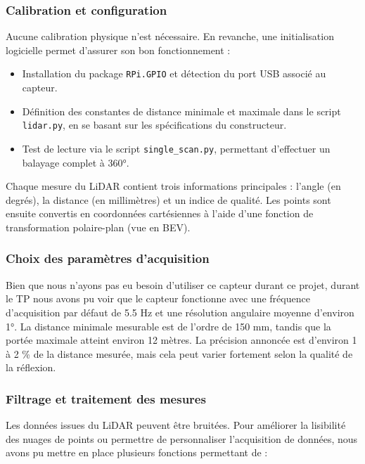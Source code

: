 \vspace{1em}
\subsubsection*{Calibration et configuration}

Aucune calibration physique n'est nécessaire. En revanche, une initialisation logicielle permet d'assurer son bon fonctionnement :

\begin{itemize}
    \item Installation du package \texttt{RPi.GPIO} et détection du port USB associé au capteur.
    \item Définition des constantes de distance minimale et maximale dans le script \texttt{lidar.py}, en se basant sur les spécifications du constructeur.
    \item Test de lecture via le script \texttt{single\_scan.py}, permettant d’effectuer un balayage complet à 360°.
\end{itemize}

Chaque mesure du LiDAR contient trois informations principales : l’angle (en degrés), la distance (en millimètres) et un indice de qualité. Les points sont ensuite convertis en coordonnées cartésiennes à l’aide d’une fonction de transformation polaire-plan (vue en BEV).

\vspace{1em}
\subsubsection*{Choix des paramètres d’acquisition}

Bien que nous n'ayons pas eu besoin d'utiliser ce capteur durant ce projet, durant le TP nous avons pu voir que le capteur fonctionne avec une fréquence d’acquisition par défaut de 5.5 Hz et une résolution angulaire moyenne d’environ 1°. La distance minimale mesurable est de l’ordre de 150 mm, tandis que la portée maximale atteint environ 12 mètres. La précision annoncée est d’environ 1 à 2 \% de la distance mesurée, mais cela peut varier fortement selon la qualité de la réflexion.

\vspace{1em}
\subsubsection*{Filtrage et traitement des mesures}

Les données issues du LiDAR peuvent être bruitées. Pour améliorer la lisibilité des nuages de points ou permettre de personnaliser l'acquisition de données, nous avons pu mettre en place plusieurs fonctions permettant de :

